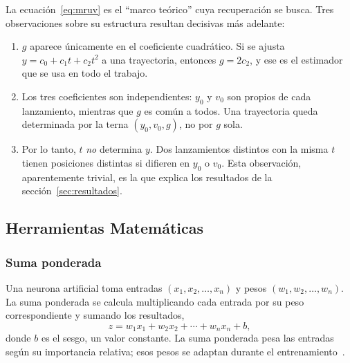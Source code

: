 \documentclass[titlepage,11pt]{article}
\begin{document}
La ecuación~\eqref{eq:mruv} es el \enquote{marco teórico} cuya recuperación se
busca. Tres observaciones sobre su estructura resultan decisivas más adelante:

\begin{enumerate}
\item $g$ aparece únicamente en el coeficiente cuadrático. Si se ajusta
  $y=c_0+c_1t+c_2t^2$ a una trayectoria, entonces $g=2c_2$, y ese es el
  estimador que se usa en todo el trabajo.
\item Los tres coeficientes son independientes: $y_0$ y $v_0$ son propios de
  cada lanzamiento, mientras que $g$ es común a todos. Una trayectoria queda
  determinada por la terna $(y_0,v_0,g)$, no por $g$ sola.
\item Por lo tanto, $t$ \emph{no} determina $y$. Dos lanzamientos distintos
  con la misma $t$ tienen posiciones distintas si difieren en $y_0$ o $v_0$.
  Esta observación, aparentemente trivial, es la que explica los resultados de
  la sección~\ref{sec:resultados}.
\end{enumerate}

\subsection{Herramientas Matemáticas}
\label{subsec:mat}

\subsubsection{Suma ponderada}
Una neurona artificial toma entradas $(x_1,x_2,\ldots,x_n)$ y pesos
$(w_1,w_2,\ldots,w_n)$. La suma ponderada se calcula multiplicando cada
entrada por su peso correspondiente y sumando los resultados,
\begin{equation}
  z = w_1x_1 + w_2x_2 + \cdots + w_nx_n + b,
\end{equation}
donde $b$ es el sesgo, un valor constante. La suma ponderada pesa las entradas
según su importancia relativa; esos pesos se adaptan durante el
entrenamiento~\cite{triola_2018_estadstica}.
\end{document}
